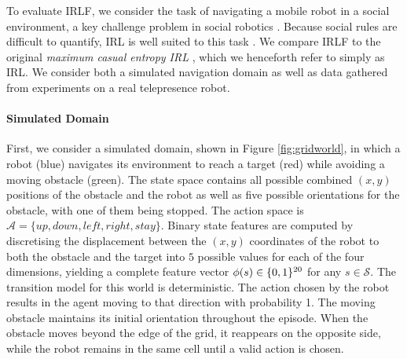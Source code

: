 \documentclass{aamas2016}
\begin{document}
To evaluate IRLF, we consider the task of navigating a mobile robot in a social environment, a key challenge problem in social robotics \cite{pacchierotti2006embodied}. Because social rules are difficult to quantify, IRL is well suited to this task \cite{henry2010learning,vasquez2014inverse}.  We compare IRLF to the original \emph{maximum casual entropy IRL} \cite{ziebart2008maximum}, which we henceforth refer to simply as IRL.  We  consider both a simulated navigation domain as well as data gathered from experiments on a real telepresence robot.
\paragraph{Simulated Domain}

First, we consider a simulated domain, shown in Figure \ref{fig:gridworld}, in which a robot (blue) navigates its environment to reach a target (red) while avoiding a moving
obstacle (green). The state space contains all possible combined $(x,y)$ positions of the obstacle and the robot as well as five possible orientations for the obstacle, with one of them being stopped. The action space is $\mathcal{A} = \{up,down,left,right,stay\}$. Binary state features are computed by discretising the displacement between the $(x,y)$ coordinates of the robot to both the obstacle and the target into $5$ possible values for each of the four dimensions, yielding a complete feature vector $\phi(s)\in\mathbb \{0,1\}^{20}$ for any $s\in\mathcal{S}$. The transition model for this world is deterministic. The action chosen by the robot results in the agent moving to that direction with probability 1. The moving obstacle maintains its initial orientation throughout the episode. When the obstacle moves beyond the edge of the grid, it reappears on the opposite side, while the robot remains in the same cell until a valid action is chosen.
\end{document}
